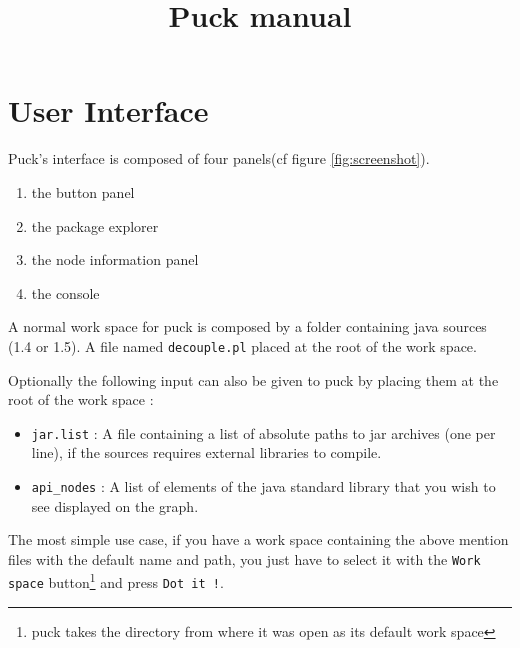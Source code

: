\documentclass[]{article}
\title{Puck manual}
\author{}
\begin{document}
\maketitle

\begin{abstract}

\end{abstract}

\section{User Interface}

Puck's interface is composed of four panels(cf figure \ref{fig:screenshot}). 

\begin{enumerate}
\item the button panel
\item the package explorer
\item the node information panel
\item the console
\end{enumerate}

A normal work space for puck is composed by a folder containing java sources (1.4 or 1.5).
A file named \verb|decouple.pl| placed at the root of the work space.

Optionally the following input can also be given to puck by placing them at the root of the work space :
\begin{itemize}
\item \verb|jar.list| : A file containing a list of absolute paths to jar archives (one per line), if the sources requires external libraries to compile.
\item \verb|api_nodes| : A list of elements of the java standard library that you wish to see displayed on the graph.
\end{itemize} 

The most simple use case, if you have a work space containing the above mention files with the default name and path, you just have to select it with the
 \verb|Work space| button\footnote{puck takes the directory from where it was open as its default work space} and press \verb|Dot it !|.
\end{document}
